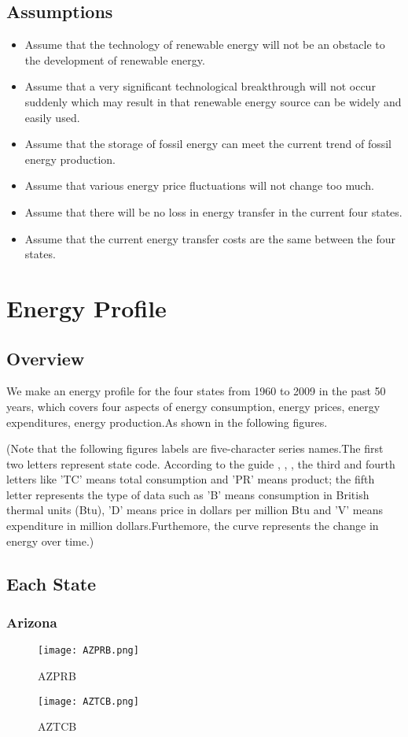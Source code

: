 \documentclass{mcmthesis}
\begin{document}
\subsection{Assumptions}
\begin{itemize}
  \item Assume that the technology of renewable energy will not be an obstacle to the development of renewable energy.
  \item Assume that a very significant technological breakthrough will not occur suddenly which may result in that renewable energy source can be widely and easily used.
  \item Assume that the storage of fossil energy can meet the current trend of fossil energy production.
  \item Assume that various energy price fluctuations will not change too much.
  \item Assume that there will be no loss in energy transfer in the current four states.
  \item Assume that the current energy transfer costs are the same between the four states.
\end{itemize}
\section{Energy Profile}
\subsection{Overview}
We make an energy profile for the four states from 1960 to 2009 in the past 50 years, which covers four aspects of energy consumption, energy prices, energy expenditures, energy production.As shown in the following figures.

(Note that the following figures labels are five-character series names.The first two letters  represent state code. According to the guide \cite{pr_guide}, \cite{use_guide}, \cite{product}, the third and fourth letters like 'TC' means total consumption and 'PR' means product; the fifth letter represents the type of data such as 'B' means consumption in British thermal units (Btu), 'D' means price in dollars per million Btu and 'V' means expenditure in million dollars.Furthemore, the curve represents the change in energy over time.) 

\subsection{Each State}
\subsubsection{Arizona}
\begin{figure}[H]
\begin{minipage}[htb]{0.5\textwidth}
\centering
\texttt{[image: AZPRB.png]}
\caption{AZPRB} \label{fig:AZPRB}
\end{minipage}
\begin{minipage}[htb]{0.5\textwidth}
\centering
\texttt{[image: AZTCB.png]}
\caption{AZTCB} \label{fig:AZTCB}
\end{minipage}
\end{figure}
\end{document}
